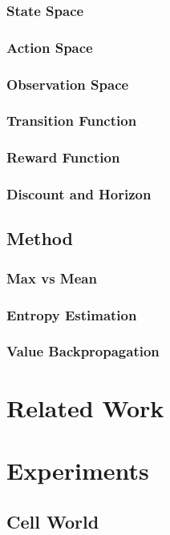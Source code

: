 \documentclass[10pt,twoside]{report}
\begin{document}
        \subsection{State Space}
        \subsection{Action Space}
        \subsection{Observation Space}
        \subsection{Transition Function}
        \subsection{Reward Function}
        \subsection{Discount and Horizon}

    \section{Method}
        \subsection{Max vs Mean}
        \subsection{Entropy Estimation}
        \subsection{Value Backpropagation}

\chapter{Related Work}\label{ref:relwork}


\chapter{Experiments}\label{ref:experiments}
    \section{Cell World}
\end{document}
